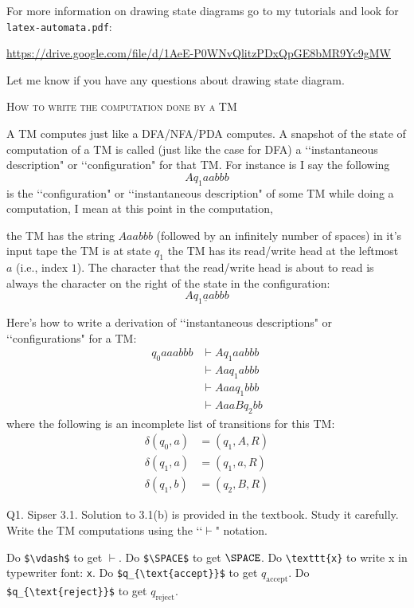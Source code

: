 For more information on drawing state diagrams go to my tutorials and
look for \verb!latex-automata.pdf!:
\begin{center}
{\small \url{https://drive.google.com/file/d/1AeE-P0WNvQlitzPDxQpGE8bMR9Yc9gMW}}
\end{center}
Let me know if you have any questions about drawing state diagram.

\textsc{How to write the computation done by a TM}

A TM computes just like a DFA/NFA/PDA computes.
A snapshot of the state of computation of a TM is called (just like the
case for DFA) a \lq\lq instantaneous description" or
\lq\lq configuration" for that TM.
For instance is I say the following
\[
Aq_1aabbb
\]
is the \lq\lq configuration" or \lq\lq instantaneous description"
of some TM while doing a computation, I mean
at this point in the computation,
\begin{itemize}
\li the TM has the string $Aaabbb$ (followed by an
infinitely number of spaces) in it's input tape
\li the TM is at state $q_1$
\li the TM has its read/write head at the leftmost $a$ (i.e., index $1$).
The character that the read/write head is about to read is always
the character on the right of the state in the configuration:
\[
Aq_1\underline{a}abbb
\]
\end{itemize}

Here's how to write a derivation of \lq\lq instantaneous descriptions" or
\lq\lq configurations" for a TM:
\begin{align*}
q_0 aaabbb &\vdash Aq_1aabbb \\ 
           &\vdash Aaq_1abbb \\ 
           &\vdash Aaaq_1bbb \\
           &\vdash AaaBq_2bb 
\end{align*}
where the following is an incomplete list of transitions for this TM:
\begin{align*}
\delta(q_0, a) &= (q_1, A, R) \\
\delta(q_1, a) &= (q_1, a, R) \\
\delta(q_1, b) &= (q_2, B, R) 
\end{align*}

\newpage
Q1. Sipser 3.1. 
Solution to 3.1(b) is provided in the textbook. Study it carefully.
Write the TM computations using the \lq\lq $\vdash$" notation.
\begin{myenum}
\li Do \verb!$\vdash$! to get $\vdash$.
\li Do \verb!$\SPACE$! to get $\SPACE$.
\li Do \verb!\texttt{x}! to write x in typewriter font: \texttt{x}.
\li Do \verb!$q_{\text{accept}}$! to get $q_{\text{accept}}$.
\li Do \verb!$q_{\text{reject}}$! to get $q_{\text{reject}}$.
\end{myenum}


